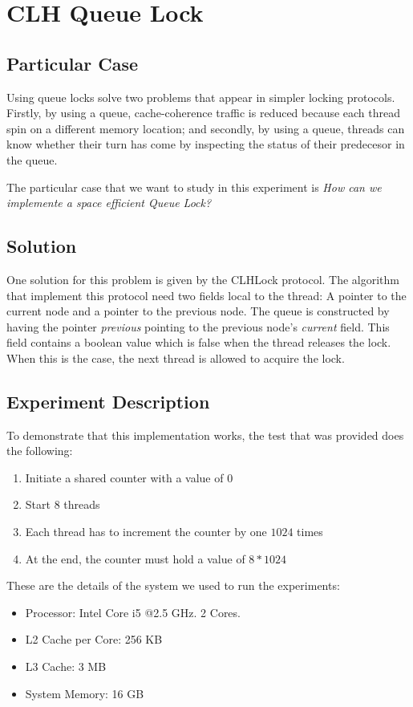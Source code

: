 \section{\textbf{CLH Queue Lock}}
\subsection{Particular Case}
\par
Using queue locks solve two problems that appear in simpler locking protocols. Firstly, by using a queue, cache-coherence traffic is reduced because each thread spin on a different memory location; and secondly, by using a queue, threads can know whether their turn has come by inspecting the status of their predecesor in the queue.
\par
The particular case that we want to study in this experiment is \textit{How can we implemente a space efficient Queue Lock?}
\par
\subsection{Solution}
\par
One solution for this problem is given by the CLHLock protocol. The algorithm that implement this protocol need two fields local to the thread: A pointer to the current node and a pointer to the previous node. The queue is constructed by having the pointer \textit{previous} pointing to the previous node's \textit{current} field. This field contains a boolean value which is false when the thread releases the lock. When this is the case, the next thread is allowed to acquire the lock. 
\par
\subsection{Experiment Description}
\par
To demonstrate that this implementation works, the test that was provided does the following:
\begin{enumerate}
\item Initiate a shared counter with a value of $0$
\item Start $8$ threads
\item Each thread has to increment the counter by one $1024$ times
\item At the end, the counter must hold a value of $8*1024$
\end{enumerate}
\par
These are the details of the system we used to run the experiments:
\begin{itemize}
\item Processor: Intel Core i5 @2.5 GHz. 2 Cores.
\item L2 Cache per Core: 256 KB
\item L3 Cache: 3 MB
\item System Memory: 16 GB
\end{itemize}
